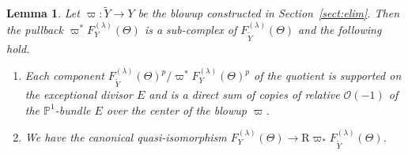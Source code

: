 \documentclass[11pt]{article}
\newcommand{\PP}{\mathbb{P}}
\newcommand{\sO}{\mathscr{O}}
\newcommand{\ddRH}{\Theta}
\newcommand{\RD}{\mathrm{R}}
\newtheorem*{lemma*}{Lemma}
\begin{document}
\begin{lemma*} Let $\varpi\colon \widetilde{Y} \to Y$ be the blowup constructed in Section~{\rm \ref{sect:elim}}. Then the pullback $\varpi^*F_Y^{(\lambda)}(\ddRH)$ is a sub-complex of $F_{\widetilde{Y}}^{(\lambda)}(\ddRH)$
and the following hold.
\begin{enumerate}\itemsep=0pt
\item Each component $F_{\widetilde{Y}}^{(\lambda)}(\ddRH)^p/\varpi^*F_Y^{(\lambda)}(\ddRH)^p$ of the quotient is supported on the exceptional divisor $E$ and is a direct sum of copies of relative $\sO(-1)$ of the $\PP^1$-bundle $E$ over the center of the blowup $\varpi$.
\item We have the canonical quasi-isomorphism $F_Y^{(\lambda)}(\ddRH) \to \RD\varpi_*F_{\widetilde{Y}}^{(\lambda)}(\ddRH)$.
\end{enumerate}
\end{lemma*}
\end{document}
